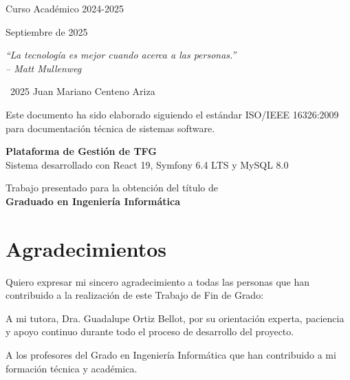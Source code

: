 \begin{titlepage}
\vspace{2cm}

{\large Curso Académico 2024-2025\par}
{\large Septiembre de 2025\par}

\vfill

\textit{``La tecnología es mejor cuando acerca a las personas.''}\\
\textit{-- Matt Mullenweg}

\end{titlepage}

\newpage
\thispagestyle{empty}
\vspace*{\fill}
\begin{center}
\textcopyright\ 2025 Juan Mariano Centeno Ariza

\vspace{1cm}

Este documento ha sido elaborado siguiendo el estándar ISO/IEEE 16326:2009 \\
para documentación técnica de sistemas software.

\vspace{1cm}

\textbf{Plataforma de Gestión de TFG} \\
Sistema desarrollado con React 19, Symfony 6.4 LTS y MySQL 8.0

\vspace{1cm}

Trabajo presentado para la obtención del título de \\
\textbf{Graduado en Ingeniería Informática}

\end{center}
\vspace*{\fill}

\newpage
\chapter*{Agradecimientos}

Quiero expresar mi sincero agradecimiento a todas las personas que han contribuido 
a la realización de este Trabajo de Fin de Grado:

A mi tutora, Dra. Guadalupe Ortiz Bellot, por su orientación experta, paciencia y apoyo 
continuo durante todo el proceso de desarrollo del proyecto.

A los profesores del Grado en Ingeniería Informática que han contribuido a mi 
formación técnica y académica.

